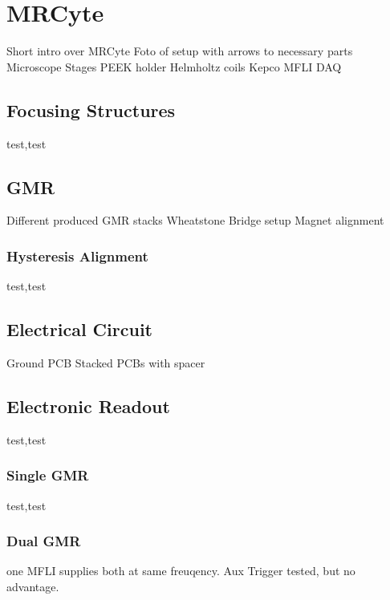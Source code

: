 \section{MRCyte}
Short intro over MRCyte
Foto of setup with arrows to necessary parts
Microscope
Stages
PEEK holder
Helmholtz coils
Kepco
MFLI
DAQ
\subsection{Focusing Structures}
test,test
\subsection{GMR}
Different produced GMR stacks
Wheatstone Bridge setup
Magnet alignment
\subsubsection{Hysteresis Alignment}
test,test
\subsection{Electrical Circuit}
Ground
PCB
Stacked PCBs with spacer
\subsection{Electronic Readout}
test,test
\subsubsection{Single GMR}
test,test
\subsubsection{Dual GMR}
one MFLI supplies both at same freuqency. Aux Trigger tested, but no advantage.


